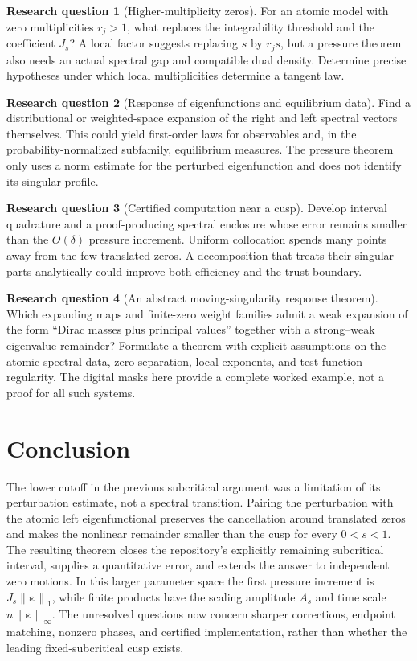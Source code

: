 \documentclass[11pt,a4paper]{article}
\numberwithin{equation}{section}
\theoremstyle{definition}
\newtheorem{question}{Research question}
\theoremstyle{remark}
\newcommand{\norm}[1]{\left\lVert#1\right\rVert}
\newcommand{\eps}{\boldsymbol\varepsilon}
\begin{document}
\begin{question}[Higher-multiplicity zeros]
For an atomic model with zero multiplicities $r_j>1$, what replaces
the integrability threshold and the coefficient $J_s$? A local factor
suggests replacing $s$ by $r_js$, but a pressure theorem also needs
an actual spectral gap and compatible dual density. Determine precise
hypotheses under which local multiplicities determine a tangent law.
\end{question}

\begin{question}[Response of eigenfunctions and equilibrium data]
Find a distributional or weighted-space expansion of the right and
left spectral vectors themselves. This could yield first-order laws
for observables and, in the probability-normalized subfamily,
equilibrium measures. The pressure theorem only uses a norm estimate
for the perturbed eigenfunction and does not identify its singular
profile.
\end{question}

\begin{question}[Certified computation near a cusp]
Develop interval quadrature and a proof-producing spectral enclosure
whose error remains smaller than the $O(\delta)$ pressure increment.
Uniform collocation spends many points away from the few translated
zeros. A decomposition that treats their singular parts analytically
could improve both efficiency and the trust boundary.
\end{question}

\begin{question}[An abstract moving-singularity response theorem]
Which expanding maps and finite-zero weight families admit a weak
expansion of the form ``Dirac masses plus principal values'' together
with a strong--weak eigenvalue remainder? Formulate a theorem with
explicit assumptions on the atomic spectral data, zero separation,
local exponents, and test-function regularity. The digital masks here
provide a complete worked example, not a proof for all such systems.
\end{question}

\section{Conclusion}
The lower cutoff in the previous subcritical argument was a limitation
of its perturbation estimate, not a spectral transition. Pairing the
perturbation with the atomic left eigenfunctional preserves the
cancellation around translated zeros and makes the nonlinear remainder
smaller than the cusp for every $0<s<1$.
The resulting theorem closes the repository's explicitly remaining
subcritical interval, supplies a quantitative error, and extends the
answer to independent zero motions. In this larger parameter space the
first pressure increment is $J_s\norm\eps_1$, while finite products
have the scaling amplitude $A_s$ and time scale $n\norm\eps_\infty$.
The unresolved questions now concern sharper corrections, endpoint
matching, nonzero phases, and certified implementation, rather than
whether the leading fixed-subcritical cusp exists.
\end{document}
